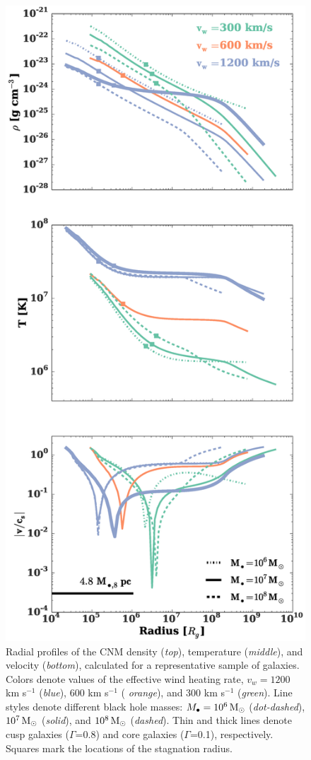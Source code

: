 \documentclass[usenatbib,fleqn]{mn2e}
\newcommand{\Mbh}[1][]{M_{\bullet#1}}
\newcommand{\vwO}{v_{w}}
\begin{document}
\begin{figure}
  \includegraphics[width=\columnwidth]{profiles.eps}
  \caption{\label{fig:profiles}Radial profiles of the CNM density
    ({\it top}), temperature ({\it middle}), and velocity ({\it bottom}),
    calculated for a representative sample of galaxies.  Colors
    denote values of the effective wind heating rate,
    $\vwO=1200$ km s$^{-1}$ ({\it blue}), 600 km s$^{-1}$ ({\it
      orange}), and 300 km s$^{-1}$ ({\it green}).  Line styles denote different black hole masses: $\Mbh=10^6
    \Msun$ ({\it dot-dashed}), $10^7 \,{\rm M_\odot}$ ({\it solid}), and
    $10^8 \,{\rm M_\odot}$ ({\it dashed}). Thin and thick lines denote cusp galaxies ($\Gamma$=0.8) and core galaxies ($\Gamma$=0.1), respectively.  Squares mark the locations of the stagnation radius.
 }
\end{figure}
\end{document}
